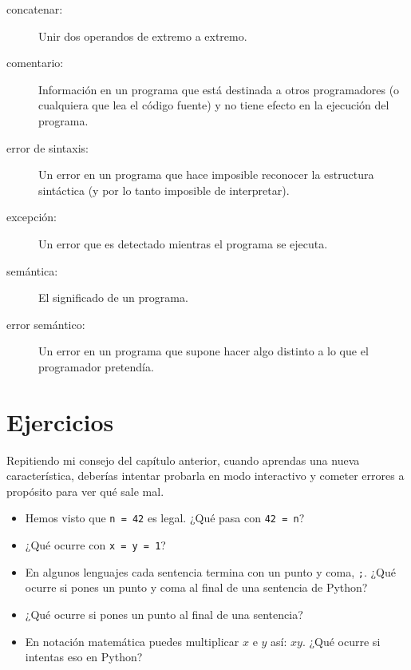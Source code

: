 \documentclass[10pt]{book}
\begin{document}
\begin{description}
\item[concatenar:]  Unir dos operandos de extremo a extremo.

\item[comentario:]  Información en un programa que está destinada a otros
programadores (o cualquiera que lea el código fuente) y no tiene efecto en la
ejecución del programa.

\item[error de sintaxis:]  Un error en un programa que hace imposible reconocer
la estructura sintáctica (y por lo tanto imposible de interpretar).

\item[excepción:]  Un error que es detectado mientras el programa se ejecuta.

\item[semántica:]  El significado de un programa.

\item[error semántico:]   Un error en un programa que supone hacer algo
distinto a lo que el programador pretendía.

\end{description}


\section{Ejercicios}

\begin{exercise}

Repitiendo mi consejo del capítulo anterior, cuando aprendas
una nueva característica, deberías intentar probarla en modo interactivo y cometer
errores a propósito para ver qué sale mal.

\begin{itemize}

\item Hemos visto que {\tt n = 42} es legal.  ¿Qué pasa con {\tt 42 = n}?

\item ¿Qué ocurre con {\tt x = y = 1}?

\item En algunos lenguajes cada sentencia termina con un punto y coma, {\tt ;}.
¿Qué ocurre si pones un punto y coma al final de una sentencia de Python?

\item ¿Qué ocurre si pones un punto al final de una sentencia?

\item En notación matemática puedes multiplicar $x$ e $y$ así: $x y$.
¿Qué ocurre si intentas eso en Python?

\end{itemize}

\end{exercise}
\end{document}
